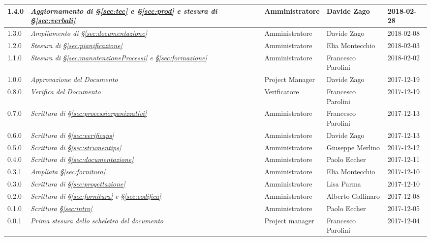\begin{longtable}[H]{C{2cm}|C{4cm}|C{3cm}|C{3cm}|R{2cm}}
		1.4.0  & \emph{Aggiornamento di §\ref{sec:tec} e §\ref{sec:prod} e stesura di §\ref{sec:verbali}} &  Amministratore & Davide Zago & 2018-02-28  \\
		\hline
		
		1.3.0  & \emph{Ampliamento di §\ref{sec:documentazione}} &  Amministratore & Davide Zago & 2018-02-08  \\
		\hline
		
		1.2.0  & \emph{Stesura di §\ref{sec:pianificazione}} &  Amministratore & Elia Montecchio & 2018-02-03  \\
		\hline
		
		1.1.0  & \emph{Stesura di §\ref{sec:manutenzioneProcessi} e §\ref{sec:formazione}} &  Amministratore & Francesco Parolini & 2018-02-02  \\
		\hline
		
		1.0.0  & \emph{Approvazione del Documento} & Project Manager & Davide Zago &  2017-12-19 \\
		\hline
		
		0.8.0  &  \emph{Verifica del Documento} & Verificatore & Francesco Parolini & 2017-12-19 \\
		\hline
		
		0.7.0  & \emph{Scrittura di §\ref{sec:processiorganizzativi}}  & Amministratore & Francesco Parolini & 2017-12-13\\
		\hline
		
		0.6.0  & \emph{Scrittura di §\ref{sec:verificaps}} &  Amministratore & Davide Zago  & 2017-12-13 \\
		\hline
		
		0.5.0  & \emph{Scrittura di §\ref{sec:strumentips}} & Amministratore & Giuseppe Merlino & 2017-12-12\\
		\hline
		
		0.4.0  &\emph{Scrittura di §\ref{sec:documentazione}}& Amministratore & Paolo Eccher  & 2017-12-11 \\
		\hline
		
		0.3.1 & \emph{Ampliata §\ref{sec:fornitura}}& Amministratore & Elia Montecchio & 2017-12-10 \\
		\hline
		
		0.3.0 & \emph{Scrittura di §\ref{sec:progettazione}} & Amministratore & Lisa Parma & 2017-12-10 \\
		\hline
		
		0.2.0 & \emph{Scrittura di §\ref{sec:fornitura} e §\ref{sec:codifica}} & Amministratore & Alberto Gallinaro & 2017-12-08 \\
		\hline
		
		0.1.0 & \emph{Scrittura §\ref{sec:intro}} & Amministratore & Paolo Eccher & 2017-12-05 \\
		\hline
		
		0.0.1 &\emph{Prima stesura dello scheletro del documento} &  Project manager & Francesco Parolini & 2017-12-04 \\
		
	

		
	\end{longtable}


	\clearpage
